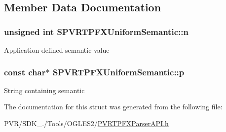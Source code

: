\subsection{Member Data Documentation}
\hypertarget{struct_s_p_v_r_t_p_f_x_uniform_semantic_a3b6bf5c4c8b2fa7375ea19eca40c7656}{
\subsubsection[{n}]{\setlength{\rightskip}{0pt plus 5cm}unsigned int S\+P\+V\+R\+T\+P\+F\+X\+Uniform\+Semantic\+::n}}\label{struct_s_p_v_r_t_p_f_x_uniform_semantic_a3b6bf5c4c8b2fa7375ea19eca40c7656}
Application-\/defined semantic value \hypertarget{struct_s_p_v_r_t_p_f_x_uniform_semantic_ae5a8acb56c4696af6bb8c9ea9f760b99}{
\subsubsection[{p}]{\setlength{\rightskip}{0pt plus 5cm}const char$\ast$ S\+P\+V\+R\+T\+P\+F\+X\+Uniform\+Semantic\+::p}}\label{struct_s_p_v_r_t_p_f_x_uniform_semantic_ae5a8acb56c4696af6bb8c9ea9f760b99}
String containing semantic 

The documentation for this struct was generated from the following file\+:\begin{DoxyCompactItemize}
\item 
P\+V\+R/\+S\+D\+K\+\_./\+Tools/\+O\+G\+L\+E\+S2/\hyperlink{_p_v_r_t_p_f_x_parser_a_p_i_8h}{P\+V\+R\+T\+P\+F\+X\+Parser\+A\+P\+I.\+h}\end{DoxyCompactItemize}
